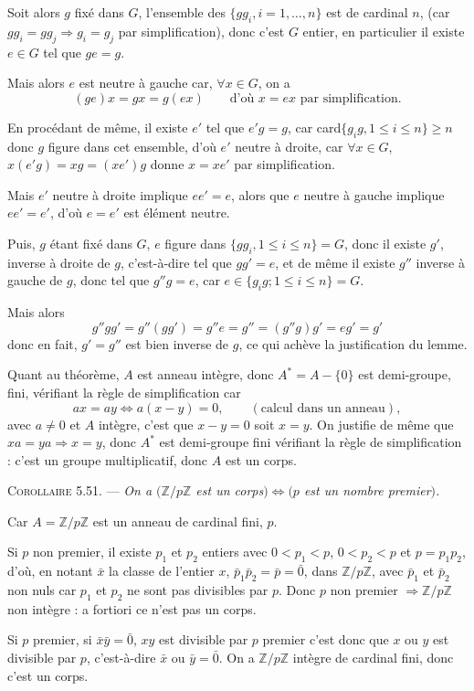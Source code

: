 Soit alors $g$ fixé dans $G$, l'ensemble des $\{gg_i,i=1,\ldots,n\}$ est de cardinal $n$, (car $gg_i=gg_j\Rightarrow g_i=g_j$ par simplification), donc c'est $G$ entier, en particulier il existe $e\in G$ tel que $ge=g$.

Mais alors $e$ est neutre à gauche car, $\forall x\in G$, on a
\[
(ge)x=gx=g(ex)\qquad\text{d'où }x=ex\text{ par simplification.}
\]

En procédant de même, il existe $e'$ tel que $e'g=g$, car card$\{g_i g,1\le i\le n\}\ge n$ donc $g$ figure dans cet ensemble, d'où $e'$ neutre à droite, car $\forall x\in G$, $x(e'g)=xg=(xe')g$ donne $x=xe'$ par simplification.

Mais $e'$ neutre à droite implique $ee'=e$, alors que $e$ neutre à gauche implique $ee'=e'$, d'où $e=e'$ est élément neutre.

Puis, $g$ étant fixé dans $G$, $e$ figure dans $\{gg_i,1\le i\le n\}=G$, donc il existe $g'$, inverse à droite de $g$, c'est-à-dire tel que $gg'=e$, et de même il existe $g''$ inverse à gauche de $g$, donc tel que $g''g=e$, car $e\in\{g_i g;1\le i\le n\}=G$.

Mais alors
\[
g''gg'=g''(gg')=g''e=g''=(g''g)g'=eg'=g'
\]
donc en fait, $g'=g''$ est bien inverse de $g$, ce qui achève la justification du lemme.

Quant au théorème, $A$ est anneau intègre, donc $A^*=A-\{0\}$ est demi-groupe, fini, vérifiant la règle de simplification car
\[
ax=ay\Longleftrightarrow a(x-y)=0,\qquad(\text{calcul dans un anneau}),
\]
avec $a\ne0$ et $A$ intègre, c'est que $x-y=0$ soit $x=y$. On justifie de même que $xa=ya\Rightarrow x=y$, donc $A^*$ est demi-groupe fini vérifiant la règle de simplification : c'est un groupe multiplicatif, donc $A$ est un corps. \bookend

\medskip\noindent\textsc{Corollaire 5.51.} --- \emph{On a $(\mathbb Z/p\mathbb Z$ est un corps$)\Longleftrightarrow(p$ est un nombre premier$)$.}

Car $A=\mathbb Z/p\mathbb Z$ est un anneau de cardinal fini, $p$.

Si $p$ non premier, il existe $p_1$ et $p_2$ entiers avec $0<p_1<p$, $0<p_2<p$ et $p=p_1p_2$, d'où, en notant $\bar x$ la classe de l'entier $x$, $\bar p_1\bar p_2=\bar p=\bar0$, dans $\mathbb Z/p\mathbb Z$, avec $\bar p_1$ et $\bar p_2$ non nuls car $p_1$ et $p_2$ ne sont pas divisibles par $p$. Donc $p$ non premier $\Rightarrow\mathbb Z/p\mathbb Z$ non intègre : a fortiori ce n'est pas un corps.

Si $p$ premier, si $\bar x\bar y=\bar0$, $xy$ est divisible par $p$ premier c'est donc que $x$ ou $y$ est divisible par $p$, c'est-à-dire $\bar x$ ou $\bar y=\bar0$. On a $\mathbb Z/p\mathbb Z$ intègre de cardinal fini, donc c'est un corps. \bookend

